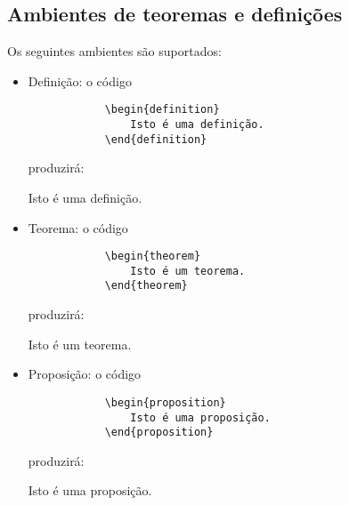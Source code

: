 

\newcommand{\com}[1]{\textbf{\backslash#1}}
\newcommand{\comp}[2]{\textbf{\backslash#1\{#2\}}}
\newcommand{\compp}[3]{\textbf{\backslash#1\{#2\}\{#3\}}}
\newcommand{\comop}[3]{\textbf{\backslash#1[#2]\{#3\}}}

\subsection{Ambientes de teoremas e definições}

Os seguintes ambientes são suportados:

\begin{itemize}
    \item Definição: o código
        \begin{verbatim}
            \begin{definition}
                Isto é uma definição.
            \end{definition}\end{verbatim}
        produzirá:
        \begin{definition}
            Isto é uma definição.
        \end{definition}
        
    \item Teorema: o código
        \begin{verbatim}
            \begin{theorem}
                Isto é um teorema.
            \end{theorem}\end{verbatim}
        produzirá:
        \begin{theorem}
            Isto é um teorema.
        \end{theorem}
        
    \item Proposição: o código
        \begin{verbatim}
            \begin{proposition}
                Isto é uma proposição.
            \end{proposition}\end{verbatim}
        produzirá:
        \begin{proposition}
            Isto é uma proposição.
        \end{proposition}
        

\end{itemize}
